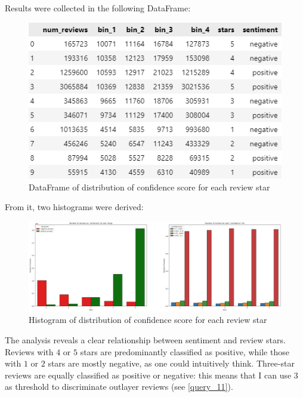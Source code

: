 \documentclass{Configuration_Files/PoliMi3i_thesis}
\begin{document}
Results were collected in the following DataFrame:

\bigskip

\begin{figure}[H]
    \centering
    \includegraphics[width=3\columnwidth / 4]{imgs/query_10b.png}
    \caption{DataFrame of distribution of confidence score for each review star}
    \label{fig:query_10b}
\end{figure}

\bigskip

From it, two histograms were derived: 

\bigskip

\begin{figure}[H]
    \centering
    \includegraphics[width=\columnwidth]{imgs/query_10.png}
    \caption{Histogram of distribution of confidence score for each review star}
    \label{fig:query_10}
\end{figure}

\bigskip

The analysis reveals a clear relationship between sentiment and review stars. Reviews with $4$ or $5$ stars are predominantly classified as positive, while those with $1$ or $2$ stars are mostly negative, as one could intuitively think. Three-star reviews are equally classified as positive or negative: this means that I can use $3$ as threshold to discriminate outlayer reviews (see \ref{query_11}).
\end{document}
